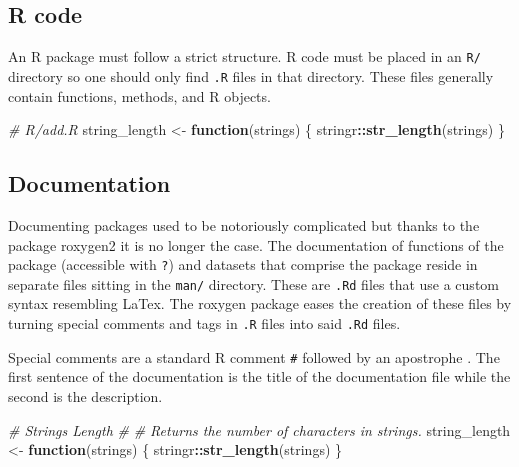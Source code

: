 \documentclass[
  10pt,
]{krantz}
\makeatletter
\newenvironment{Shaded}{\begin{snugshade}}{\end{snugshade}}
\newcommand{\CommentTok}[1]{\textcolor[rgb]{0.37,0.37,0.37}{\textit{#1}}}
\newcommand{\ControlFlowTok}[1]{\textcolor[rgb]{0.27,0.27,0.27}{\textbf{#1}}}
\newcommand{\KeywordTok}[1]{\textcolor[rgb]{0.27,0.27,0.27}{\textbf{#1}}}
\newcommand{\NormalTok}[1]{#1}
\newcommand{\OperatorTok}[1]{\textcolor[rgb]{0.43,0.43,0.43}{\textbf{#1}}}
\newcommand{\StringTok}[1]{\textcolor[rgb]{0.5,0.5,0.5}{#1}}
\newenvironment{kframe}{%
\medskip{}
\setlength{\fboxsep}{.8em}
 \def\at@end@of@kframe{}%
 \ifinner\ifhmode%
  \def\at@end@of@kframe{\end{minipage}}%
  \begin{minipage}{\columnwidth}%
 \fi\fi%
 \def\FrameCommand##1{\hskip\@totalleftmargin \hskip-\fboxsep
 \colorbox{shadecolor}{##1}\hskip-\fboxsep
     \hskip-\linewidth \hskip-\@totalleftmargin \hskip\columnwidth}%
 \MakeFramed {\advance\hsize-\width
   \@totalleftmargin\z@ \linewidth\hsize
   \@setminipage}}%
 {\par\unskip\endMakeFramed%
 \at@end@of@kframe}
\renewenvironment{Shaded}{\begin{kframe}}{\end{kframe}}
\makeatother
\begin{document}
\hypertarget{basics-r-code}{%
\subsection{R code}\label{basics-r-code}}

An R package must follow a strict structure. R code must be placed in an \texttt{R/} directory so one should only find \texttt{.R} files in that directory. These files generally contain functions, methods, and R objects.

\begin{Shaded}
\begin{Highlighting}[]
\CommentTok{\# R/add.R}
\NormalTok{string\_length <{-}}\StringTok{ }\ControlFlowTok{function}\NormalTok{(strings) \{}
\NormalTok{  stringr}\OperatorTok{::}\KeywordTok{str\_length}\NormalTok{(strings)}
\NormalTok{\}}
\end{Highlighting}
\end{Shaded}

\hypertarget{basics-documentation}{%
\subsection{Documentation}\label{basics-documentation}}

Documenting packages used to be notoriously complicated but thanks to the package roxygen2 it is no longer the case. The documentation of functions of the package (accessible with \texttt{?}) and datasets that comprise the package reside in separate files sitting in the \texttt{man/} directory. These are \texttt{.Rd} files that use a custom syntax resembling LaTex. The roxygen package eases the creation of these files by turning special comments and tags in \texttt{.R} files into said \texttt{.Rd} files.

Special comments are a standard R comment \texttt{\#} followed by an apostrophe \texttt{\textquotesingle{}}. The first sentence of the documentation is the title of the documentation file while the second is the description.

\begin{Shaded}
\begin{Highlighting}[]
\CommentTok{\#\textquotesingle{} Strings Length}
\CommentTok{\#\textquotesingle{} }
\CommentTok{\#\textquotesingle{} Returns the number of characters in strings. }
\NormalTok{string\_length <{-}}\StringTok{ }\ControlFlowTok{function}\NormalTok{(strings) \{}
\NormalTok{  stringr}\OperatorTok{::}\KeywordTok{str\_length}\NormalTok{(strings)}
\NormalTok{\}}
\end{Highlighting}
\end{Shaded}
\end{document}
